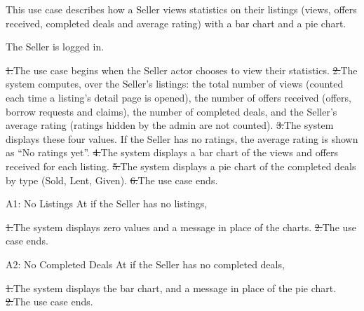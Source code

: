 This use case describes how a Seller views statistics on their listings (views, offers received, completed deals and average rating) with a bar chart and a pie chart.\par
{}
The Seller is logged in.\par
{}
\st{1.}{The use case begins when the Seller actor chooses to view their statistics.}
\st{2.}{The system computes, over the Seller's listings: the total number of views (counted each time a listing's detail page is opened), the number of offers received (offers, borrow requests and claims), the number of completed deals, and the Seller's average rating (ratings hidden by the admin are not counted).}
\st{3.}{The system displays these four values. If the Seller has no ratings, the average rating is shown as ``No ratings yet''.}
\st{4.}{The system displays a bar chart of the views and offers received for each listing.}
\st{5.}{The system displays a pie chart of the completed deals by type (Sold, Lent, Given).}
\st{6.}{The use case ends.}
\begin{flowblock}{A1: No Listings}
At  if the Seller has no listings,\par
\st{1.}{The system displays zero values and a message in place of the charts.}
\st{2.}{The use case ends.}
\end{flowblock}
\begin{flowblock}{A2: No Completed Deals}
At  if the Seller has no completed deals,\par
\st{1.}{The system displays the bar chart, and a message in place of the pie chart.}
\st{2.}{The use case ends.}
\end{flowblock}


